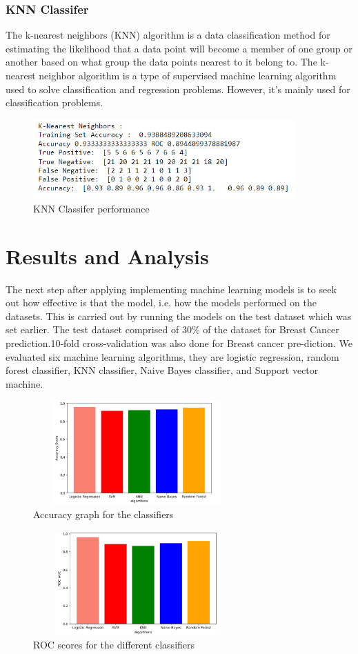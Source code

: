 \documentclass[conference]{IEEEtran}
\begin{document}
\subsubsection{KNN Classifer}
The k-nearest neighbors (KNN) algorithm is a data classification method for estimating the likelihood that a data point will become a member of one group or another based on what group the data points nearest to it belong to.
The k-nearest neighbor algorithm is a type of supervised machine learning algorithm used to solve classification and regression problems. However, it's mainly used for classification problems.
\begin{figure}[htbp]
\centerline{\includegraphics[width=100mm]{knn.png}}
\caption{KNN Classifer performance}
\label{fig}
\end{figure}

\section{Results and Analysis}

The next step after applying implementing machine learning models is to seek out how effective is that the model, i.e. how the models performed on the datasets. This is carried out by running the models on the test dataset which was set earlier. The test dataset comprised of 30\% of the dataset for Breast Cancer prediction.10-fold cross-validation was also done for Breast cancer pre-diction. We evaluated six machine learning algorithms, they are logistic regression, random forest classifier, KNN classifier, Naive Bayes classifier, and  Support vector machine.
\begin{figure}[htbp]
\centerline{\includegraphics[width=8cm, height=4cm]{accuracy.png}}
\caption{Accuracy graph for the classifiers}
\label{fig}
\end{figure}
\begin{figure}[htbp]
\centerline{\includegraphics[width=8cm, height=4cm]{roc_auc.png}}
\caption{ROC scores for the different classifiers}
\label{fig}
\end{figure}
\end{document}

